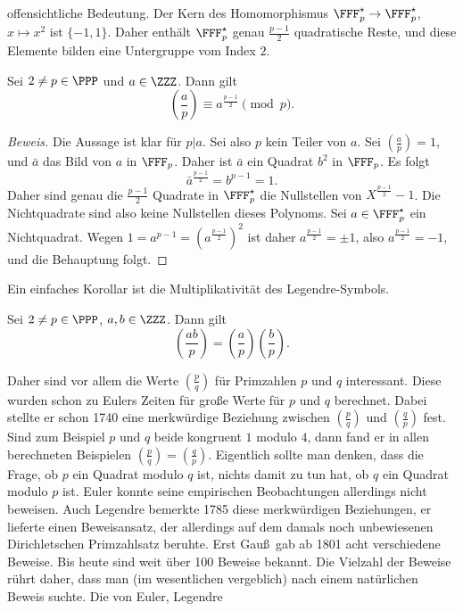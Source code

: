 \documentclass[12pt,a4paper,twoside]{article}
\begin{document}
offensichtliche Bedeutung. Der Kern des Homomorphismus
$\FFF_p^\star\to\FFF_p^\star$, $x\mapsto x^2$ ist $\{-1,1\}$. Daher enth\"alt
$\FFF_p^\star$ genau $\frac{p-1}{2}$ quadratische Reste, und diese Elemente
bilden eine Untergruppe vom Index $2$.
\begin{Satz}
  Sei $2\ne p\in\PPP$ und $a\in\ZZZ$. Dann gilt
\[
\left(\frac{a}{p}\right)\equiv a^{\frac{p-1}{2}}\pmod{p}.
\]
\end{Satz}
\begin{proof}[Beweis]
  Die Aussage ist klar f\"ur $p|a$. Sei also $p$ kein Teiler von $a$. Sei
  $\left(\frac{a}{p}\right)=1$, und $\bar a$ das Bild von $a$ in
  $\FFF_p$. Daher ist $\bar a$ ein Quadrat $b^2$ in $\FFF_p$. Es folgt
\[
\bar a^{\frac{p-1}{2}}=b^{p-1}=1.
\]
Daher sind genau die $\frac{p-1}{2}$ Quadrate in $\FFF_p^\star$ die
Nullstellen von $X^{\frac{p-1}{2}}-1$. Die Nichtquadrate sind also keine
Nullstellen dieses Polynoms. Sei $a\in\FFF_p^\star$ ein Nichtquadrat. Wegen
$1=a^{p-1}=(a^{\frac{p-1}{2}})^2$ ist daher $a^{\frac{p-1}{2}}=\pm1$, also
$a^{\frac{p-1}{2}}=-1$, und die Behauptung folgt.
\end{proof}
Ein einfaches Korollar ist die Multiplikativit\"at des Legendre-Symbols.
\begin{Lemma}
  Sei $2\ne p\in\PPP$, $a,b\in\ZZZ$. Dann gilt
\[
\left(\frac{ab}{p}\right)=\left(\frac{a}{p}\right)\left(\frac{b}{p}\right).
\]
\end{Lemma}
Daher sind vor allem die Werte $\left(\frac{p}{q}\right)$ f\"ur Primzahlen $p$
und $q$ interessant. Diese wurden schon zu Eulers Zeiten f\"ur gro\ss e Werte
f\"ur $p$ und $q$ berechnet. Dabei stellte er schon 1740 eine merkw\"urdige
Beziehung zwischen $\left(\frac{p}{q}\right)$ und $\left(\frac{q}{p}\right)$
fest. Sind zum Beispiel $p$ und $q$ beide kongruent $1$ modulo $4$, dann fand
er in allen berechneten Beispielen
$\left(\frac{p}{q}\right)=\left(\frac{q}{p}\right)$. Eigentlich sollte man
denken, dass die Frage, ob $p$ ein Quadrat modulo $q$ ist, nichts damit zu tun
hat, ob $q$ ein Quadrat modulo $p$ ist. Euler konnte seine empirischen
Beobachtungen allerdings nicht beweisen. Auch Legendre bemerkte 1785 diese
merkw\"urdigen Beziehungen, er lieferte einen Beweisansatz, der allerdings auf
dem damals noch unbewiesenen Dirichletschen Primzahlsatz beruhte. Erst Gau\ss\
gab ab 1801 acht verschiedene Beweise. Bis heute sind weit \"uber 100 Beweise
bekannt. Die Vielzahl der Beweise r\"uhrt daher, dass man (im wesentlichen
vergeblich) nach einem nat\"urlichen Beweis suchte. Die von Euler, Legendre
\end{document}
